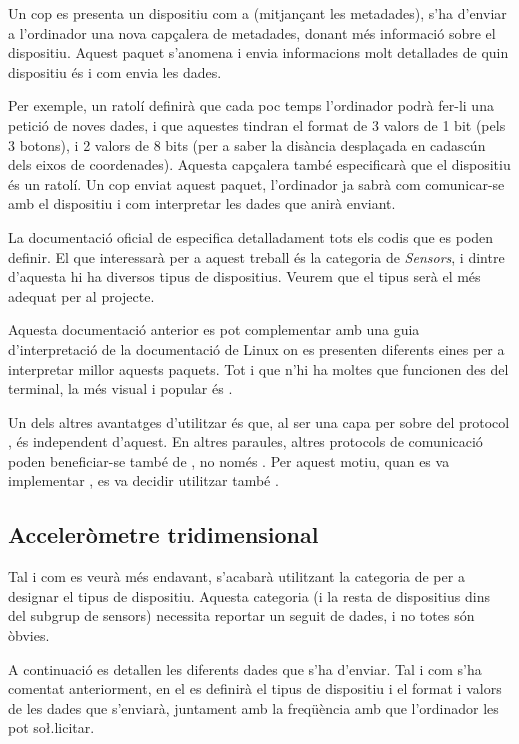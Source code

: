 Un cop es presenta un dispositiu com a 
(mitjançant les metadades), s'ha d'enviar a l'ordinador una nova capçalera de
metadades, donant més informació sobre el dispositiu. Aquest paquet s'anomena
 i envia informacions molt detallades de
quin dispositiu és i com envia les dades.

Per exemple, un ratolí definirà que cada poc temps l'ordinador podrà fer-li
una petició de noves dades, i que aquestes tindran el format de 3 valors
de 1 bit (pels 3 botons), i 2 valors de 8 bits (per a saber la disància
desplaçada en cadascún dels eixos de coordenades). Aquesta capçalera també
especificarà que el dispositiu és un ratolí. Un cop enviat aquest paquet,
l'ordinador ja sabrà com comunicar-se amb el
dispositiu i com interpretar les dades que anirà enviant.

La documentació oficial de  \cite{HidHut} especifica
detalladament tots els codis que es poden definir. El que interessarà per a
aquest treball és la categoria de \emph{Sensors}, i dintre d'aquesta hi ha
diversos tipus de dispositius. Veurem que el tipus  serà
el més adequat per al projecte.

Aquesta documentació anterior es pot complementar amb una guia d'interpretació
de la documentació de Linux \cite{LinuxHid} on es presenten diferents eines
per a interpretar millor aquests paquets. Tot i que n'hi ha moltes que
funcionen des del terminal, la més visual i popular és .

Un dels altres avantatges d'utilitzar  és que, al ser una capa per
sobre del protocol , és independent d'aquest. En altres paraules,
altres protocols de comunicació poden beneficiar-se també de , no
només . Per aquest motiu, quan es va implementar ,
es va decidir utilitzar també  \cite{BluetoothHid}.

\subsection{Acceleròmetre tridimensional}

Tal i com es veurà més endavant, s'acabarà utilitzant la categoria de
 per a designar el tipus de dispositiu. Aquesta
categoria (i la resta de dispositius dins del subgrup de sensors) necessita
reportar un seguit de dades, i no totes són òbvies.

A continuació es detallen les diferents dades que s'ha d'enviar. Tal i com s'ha
comentat anteriorment, en el  es definirà
el tipus de dispositiu i el format i valors de les dades que s'enviarà, juntament
amb la freqüència amb que l'ordinador les pot so\l.licitar.

